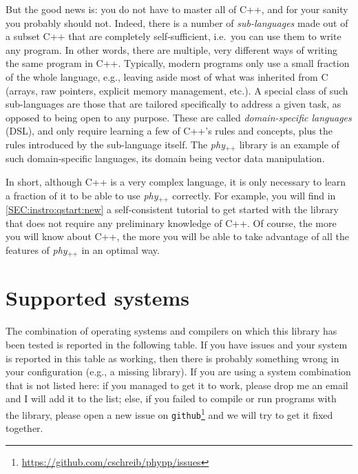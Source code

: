 \documentclass[12pt,a4paper]{report}
\newcommand{\phypp}{\textit{phy}$_{\text{++}}$\xspace}
\begin{document}
But the good news is: you do not have to master all of C++, and for your sanity you probably should not. Indeed, there is a number of \emph{sub-languages} made out of a subset C++ that are completely self-sufficient, i.e.~you can use them to write any program. In other words, there are multiple, very different ways of writing the same program in C++. Typically, modern programs only use a small fraction of the whole language, e.g., leaving aside most of what was inherited from C (arrays, raw pointers, explicit memory management, etc.). A special class of such sub-languages are those that are tailored specifically to address a given task, as opposed to being open to any purpose. These are called \emph{domain-specific languages} (DSL), and only require learning a few of C++'s rules and concepts, plus the rules introduced by the sub-language itself. The \phypp library is an example of such domain-specific languages, its domain being vector data manipulation.

In short, although C++ is a very complex language, it is only necessary to learn a fraction of it to be able to use \phypp correctly. For example, you will find in \ref{SEC:instro:qstart:new} a self-consistent tutorial to get started with the library that does not require any preliminary knowledge of C++. Of course, the more you will know about C++, the more you will be able to take advantage of all the features of \phypp in an optimal way.

\section{Supported systems \label{SEC:intro:supported}}

The combination of operating systems and compilers on which this library has been tested is reported in the following table. If you have issues and your system is reported in this table as working, then there is probably something wrong in your configuration (e.g., a missing library). If you are using a system combination that is not listed here: if you managed to get it to work, please drop me an email and I will add it to the list; else, if you failed to compile or run programs with the library, please open a new issue on \texttt{github}\footnote{\url{https://github.com/cschreib/phypp/issues}} and we will try to get it fixed together.
\end{document}
